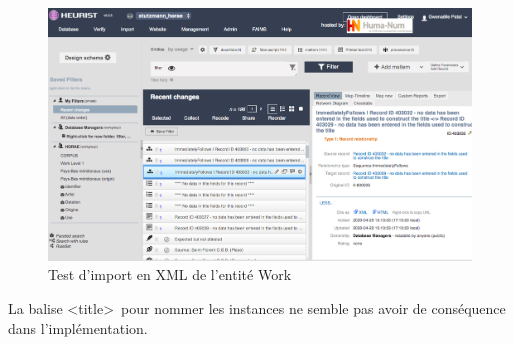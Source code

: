 \documentclass[a4paper,12pt,twoside]{book}
\begin{document}
    \begin{figure}[!h]
    \centering
    \includegraphics[width=15cm]{img/Import_Donnees/ImportTestXMLRelation.png}
    \caption{Test d'import en XML de l'entité Work}
    \end{figure}

La balise \textless title\textgreater~pour nommer les instances ne semble pas avoir de conséquence dans l'implémentation. \\
\end{document}
